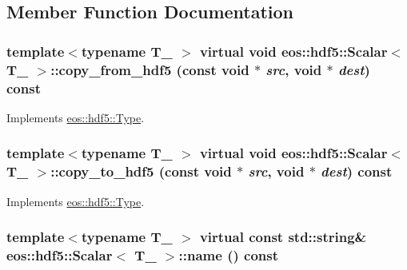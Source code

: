 \subsection{Member Function Documentation}
\hypertarget{classeos_1_1hdf5_1_1Scalar_a840b94c45ff51454eb2baae727165a71}{
\subsubsection[{copy\_\-from\_\-hdf5}]{\setlength{\rightskip}{0pt plus 5cm}template$<$typename T\_\- $>$ virtual void {\bf eos::hdf5::Scalar}$<$ T\_\- $>$::copy\_\-from\_\-hdf5 (const void $\ast$ {\em src}, \/  void $\ast$ {\em dest}) const}}
\label{classeos_1_1hdf5_1_1Scalar_a840b94c45ff51454eb2baae727165a71}


Implements \hyperlink{structeos_1_1hdf5_1_1Type_a4d1073336bce1500533e69a1187acd66}{eos::hdf5::Type}.\hypertarget{classeos_1_1hdf5_1_1Scalar_a4aeec2eb655199bd6ad02464eeb44648}{
\subsubsection[{copy\_\-to\_\-hdf5}]{\setlength{\rightskip}{0pt plus 5cm}template$<$typename T\_\- $>$ virtual void {\bf eos::hdf5::Scalar}$<$ T\_\- $>$::copy\_\-to\_\-hdf5 (const void $\ast$ {\em src}, \/  void $\ast$ {\em dest}) const}}
\label{classeos_1_1hdf5_1_1Scalar_a4aeec2eb655199bd6ad02464eeb44648}


Implements \hyperlink{structeos_1_1hdf5_1_1Type_a30b665dc2adbe459feb640c61776b50a}{eos::hdf5::Type}.\hypertarget{classeos_1_1hdf5_1_1Scalar_af914b3bd28aa664d17cc6223659c7b45}{
\subsubsection[{name}]{\setlength{\rightskip}{0pt plus 5cm}template$<$typename T\_\- $>$ virtual const std::string\& {\bf eos::hdf5::Scalar}$<$ T\_\- $>$::name () const}}
\label{classeos_1_1hdf5_1_1Scalar_af914b3bd28aa664d17cc6223659c7b45}


